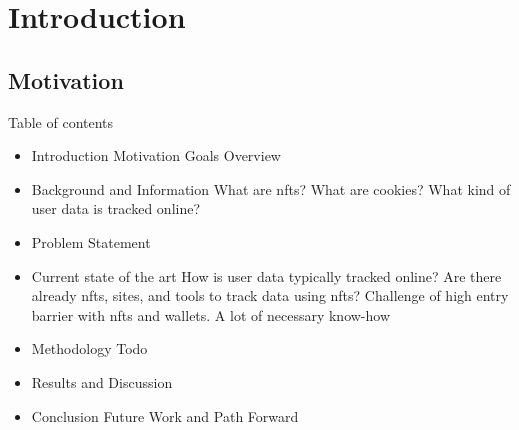 \chapter{Introduction}
\label{ch:intro}


%
%
\section{Motivation}
\label{sec:intro:motivation}

Table of contents
\begin{itemize}
	\item Introduction
	\subitem Motivation
	\subitem Goals
	\subitem Overview
	\item Background and Information
	\subitem What are nfts?
	\subitem What are cookies?
	\subitem What kind of user data is tracked online?
	\item Problem Statement
	\item Current state of the art
	\subitem How is user data typically tracked online?
	\subitem Are there already nfts, sites, and tools to track data using nfts?
	\subitem Challenge of high entry barrier with nfts and wallets. A lot of necessary know-how
	\item Methodology
	\subitem Todo
	\item Results and Discussion
	\item Conclusion
	\subitem Future Work and Path Forward
\end{itemize}
